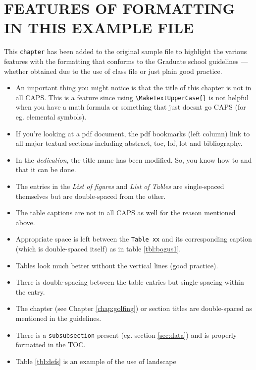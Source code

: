 \documentclass[textrefs,review]{nddiss2e}
\begin{document}
\begin{symbols} 
\end{symbols}

\mainmatter

%
%
\setcounter{chapter}{-1}
\chapter{FEATURES OF FORMATTING IN THIS EXAMPLE FILE}

This \verb+chapter+ has been added to the original sample file to highlight the
various features with the formatting that conforms to the Graduate school
guidelines --- whether obtained due to the use of \nddiss\/ class file or just
plain good practice.
\begin{itemize}
\item An important thing you might notice is that the title of this chapter 
is not in all CAPS. This is a feature since using \verb+\MakeTextUpperCase{}+ 
is not helpful
when you have a math formula or something that just doesnt go CAPS (for eg.
elemental symbols).
\item If you're looking at a pdf document, the pdf bookmarks (left column) link
to all major textual sections including abstract, toc, lof, lot and
bibliography.
\item In the {\em dedication}, the title name has been modified. So, you know
how to and that it can be done.
\item The entries in the {\em List of figures} and {\em List of Tables} are
single-spaced themselves but are double-spaced from the other.
\item The table captions are not in all CAPS as well for the reason mentioned
above.
\item Appropriate space is left between the \verb+Table xx+ and its
corresponding caption (which is double-spaced itself) as in table \ref{tbl:bogus1}.
\item Tables look much better without the vertical lines (good practice).
\item There is double-spacing between the table entries but single-spacing
within the entry.
\item The chapter (see Chapter \ref{chap:golfing}) or section titles are
double-spaced as mentioned in the guidelines.
\item There is a \verb+subsubsection+ present (eg. section \ref{sec:data}) and
is properly formatted in the TOC.
\item Table \ref{tbl:defs} is an example of the use of \textsf{landscape}

\end{itemize}
\end{document}
